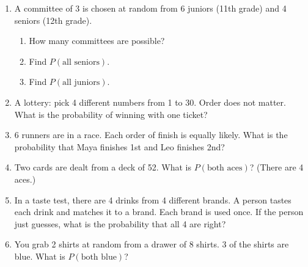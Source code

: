 \documentclass[11pt]{article}
\begin{document}
\partner

\newpage
\begin{enumerate}

\item A committee of 3 is chosen at random from 6 juniors (11th grade) and 4 seniors (12th grade).
\begin{enumerate}[itemsep=1em]
  \item How many committees are possible? 
  \item Find $P(\text{all seniors})$. 
  \work{1.5em}
  \item Find $P(\text{all juniors})$. 
\end{enumerate}
\work{2em}

\item A lottery: pick 4 different numbers from 1 to 30. Order does not matter. What is the probability of winning with one ticket?

\work{3em}

\item 6 runners are in a race. Each order of finish is equally likely. What is the probability that Maya finishes 1st and Leo finishes 2nd?

\work{3em}

\item Two cards are dealt from a deck of 52. What is $P(\text{both aces})$? (There are 4 aces.)

\work{3em}

\newpage
\item In a taste test, there are 4 drinks from 4 different brands. A person tastes each drink and matches it to a brand. Each brand is used once.
If the person just guesses, what is the probability that all 4 are right?

\work{3em}

\item You grab 2 shirts at random from a drawer of 8 shirts. 3 of the shirts are blue. What is $P(\text{both blue})$?

\work{3em}


\end{enumerate}
\end{document}
